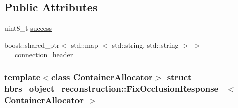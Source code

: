 \subsection*{\-Public \-Attributes}
\begin{DoxyCompactItemize}
\item 
uint8\-\_\-t \hyperlink{structhbrs__object__reconstruction_1_1_fix_occlusion_response___a20fead6fb4b41dd3c3bd6c2d71103513}{success}
\item 
boost\-::shared\-\_\-ptr$<$ std\-::map\*
$<$ std\-::string, std\-::string $>$ $>$ \hyperlink{structhbrs__object__reconstruction_1_1_fix_occlusion_response___ae0b23c01209db08f97f2b47131825bbc}{\-\_\-\-\_\-connection\-\_\-header}
\end{DoxyCompactItemize}
\subsubsection*{template$<$class Container\-Allocator$>$ struct hbrs\-\_\-object\-\_\-reconstruction\-::\-Fix\-Occlusion\-Response\-\_\-$<$ Container\-Allocator $>$}




